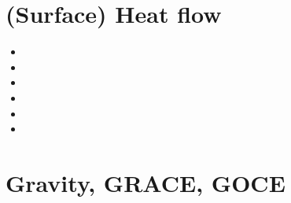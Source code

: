 \section{(Surface) Heat flow}
\begin{small}
\begin{itemize}
\item[\nineteensixtyseven] 
\item[\nineteeneightythree]
\item[\nineteenninetynine] 
\item[\twothousandnine] 
\item[\twothousandten] 
\item[\twothousandtwenty]
\end{itemize}
\end{small}

\section{Gravity, GRACE, GOCE}

